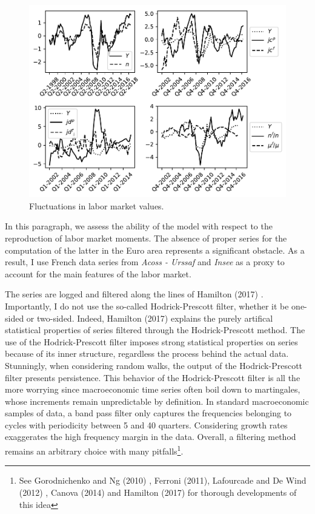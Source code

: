 \documentclass[a4paper]{article}
\begin{document}
\begin{figure}[t]
\includegraphics[scale=1.]{StylizedFacts.pdf}
\caption{Fluctuations in labor market values.}
\label{fluctuations}
\end{figure}

In this paragraph, we assess the ability of the model with respect to the reproduction of labor market moments. The absence of proper series for the computation of the latter in the Euro area represents a significant obstacle. As a result, I use French data series from \textit{Acoss - Urssaf} and \textit{Insee} as a proxy to account for the main features of the labor market.

The series are logged and filtered along the lines of Hamilton (2017) \cite{hamilton2017you}. Importantly, I do not use the so-called Hodrick-Prescott filter, whether it be one-sided or two-sided. Indeed, Hamilton (2017) explains the purely artifical statistical properties of series filtered through the Hodrick-Prescott method. The use of the Hodrick-Prescott filter imposes strong statistical properties on series because of its inner structure, regardless the process behind the actual data. Stunningly, when considering random walks, the output of the Hodrick-Prescott filter presents persistence. This behavior of the Hodrick-Prescott filter is all the more worrying since macroeconomic time series often boil down to martingales, whose increments remain unpredictable by definition. In standard macroeconomic samples of data, a band pass filter only captures the frequencies belonging to cycles with periodicity between 5 and 40 quarters. Considering growth rates exaggerates the high frequency margin in the data. Overall, a filtering method remains an arbitrary choice with many pitfalls\footnote{See Gorodnichenko and Ng (2010) \cite{GORODNICHENKO2010325}, Ferroni (2011), Lafourcade and De Wind (2012) \cite{lafourcade2012taking}, Canova (2014) and Hamilton (2017) for thorough developments of this idea}.
\end{document}
